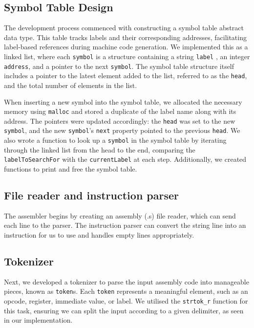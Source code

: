 \documentclass[9pt,a4paper,twoside]{tau-class/tau}
\begin{document}
    \subsection{Symbol Table Design}
    The development process commenced with constructing a symbol table abstract data type. This table tracks labels and their corresponding addresses, facilitating label-based references during machine code generation. We implemented this as a linked list, where each \texttt{symbol} is a structure containing a string \texttt{label} , an integer \texttt{address}, and a pointer to the next \texttt{symbol}. The symbol table structure itself includes a pointer to the latest element added to the list, referred to as the \texttt{head}, and the total number of elements in the list.  

    When inserting a new symbol into the symbol table, we allocated the necessary memory using \texttt{malloc} and stored a duplicate of the label name along with its address. The pointers were updated accordingly: the \texttt{head} was set to the new \texttt{symbol}, and the new \texttt{symbol}'s \texttt{next} property pointed to the previous \texttt{head}. We also wrote a function to look up a \texttt{symbol} in the symbol table by iterating through the linked list from the head to the end, comparing the \texttt{labelToSearchFor} with the \texttt{currentLabel} at each step. Additionally, we created functions to print and free the symbol table. 

    \subsection{File reader and instruction parser}
    The assembler begins by creating an assembly (.s) file reader, which can send each line to the parser. The instruction parser can convert the string line into an instruction for us to use and handles empty lines appropriately. 
    
    \subsection{Tokenizer} 
    Next, we developed a tokenizer to parse the input assembly code into manageable pieces, known as \texttt{token}s. Each \texttt{token} represents a meaningful element, such as an opcode, register, immediate value, or label. We utilised the \texttt{strtok\_r} function for this task, ensuring we can split the input according to a given delimiter, as seen in our implementation. 
\end{document}
